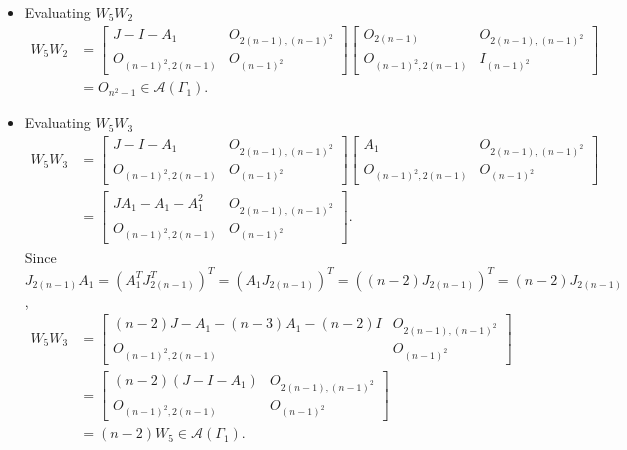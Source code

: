 \begin{itemize}
    \item Evaluating $W_5W_2$
    \begin{align*}
        W_5W_2
        &= \begin{bmatrix}
            J-I-A_1 & O_{2(n-1), (n-1)^2} \\
            O_{(n-1)^2, 2(n-1)} & O_{(n-1)^2}
        \end{bmatrix}\begin{bmatrix}
            O_{2(n-1)} & O_{2(n-1), (n-1)^2} \\
            O_{(n-1)^2, 2(n-1)} & I_{(n-1)^2}
        \end{bmatrix}\\
        &= O_{n^2-1}\in\mathcal{A}(\Gamma_1).
    \end{align*}
    
    \item Evaluating $W_5W_3$
    \begin{align*}
        W_5W_3
        &= \begin{bmatrix}
            J-I-A_1 & O_{2(n-1), (n-1)^2} \\
            O_{(n-1)^2, 2(n-1)} & O_{(n-1)^2}
        \end{bmatrix}\begin{bmatrix}
            A_1 & O_{2(n-1), (n-1)^2} \\
            O_{(n-1)^2, 2(n-1)} & O_{(n-1)^2}
        \end{bmatrix}\\
        &= \begin{bmatrix}
            JA_1-A_1-A_1^2 & O_{2(n-1), (n-1)^2} \\
            O_{(n-1)^2, 2(n-1)} & O_{(n-1)^2}
        \end{bmatrix}.
    \end{align*}
    Since $J_{2(n-1)}A_1 = (A_1^TJ_{2(n-1)}^T)^T= (A_1J_{2(n-1)})^T = ((n-2)J_{2(n-1)})^T = (n-2)J_{2(n-1)}$,
    \begin{align*}
        W_5W_3
        &= \begin{bmatrix}
            (n-2)J-A_1-(n-3)A_1 - (n-2)I & O_{2(n-1), (n-1)^2} \\
            O_{(n-1)^2, 2(n-1)} & O_{(n-1)^2}
        \end{bmatrix}\\
        &= \begin{bmatrix}
            (n-2)(J-I-A_1) & O_{2(n-1), (n-1)^2} \\
            O_{(n-1)^2, 2(n-1)} & O_{(n-1)^2}
        \end{bmatrix}\\
        &=(n-2)W_5\in\mathcal{A}(\Gamma_1).
    \end{align*}
    

\end{itemize}
